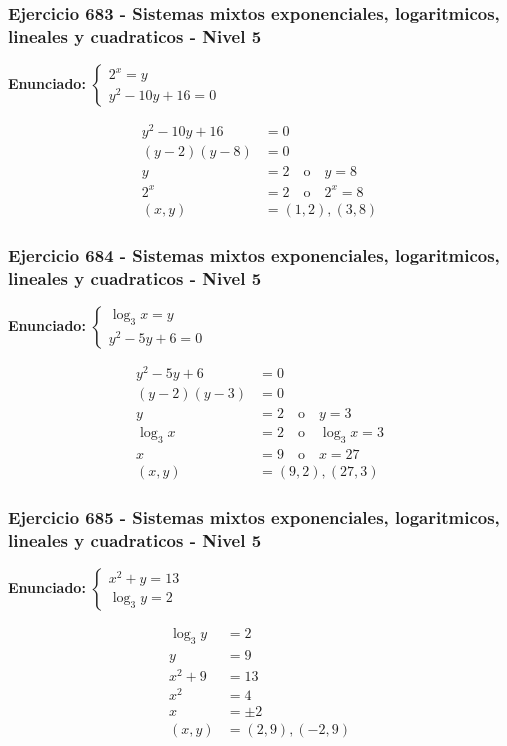 \documentclass[12pt,a4paper]{article}
\begin{document}
\subsubsection*{Ejercicio 683 - Sistemas mixtos exponenciales, logaritmicos, lineales y cuadraticos - Nivel 5}
\textbf{Enunciado:} \(\begin{cases}2^x=y\\ y^2-10y+16=0\end{cases}\)

\[
\begin{aligned}
y^2-10y+16&=0\\
(y-2)(y-8)&=0\\
y&=2\quad \text{o}\quad y=8\\
2^x&=2\quad \text{o}\quad 2^x=8\\
(x,y)&=\boxed{(1,2),(3,8)}
\end{aligned}
\]


\subsubsection*{Ejercicio 684 - Sistemas mixtos exponenciales, logaritmicos, lineales y cuadraticos - Nivel 5}
\textbf{Enunciado:} \(\begin{cases}\log_3x=y\\ y^2-5y+6=0\end{cases}\)

\[
\begin{aligned}
y^2-5y+6&=0\\
(y-2)(y-3)&=0\\
y&=2\quad \text{o}\quad y=3\\
\log_3x&=2\quad \text{o}\quad \log_3x=3\\
x&=9\quad \text{o}\quad x=27\\
(x,y)&=\boxed{(9,2),(27,3)}
\end{aligned}
\]


\subsubsection*{Ejercicio 685 - Sistemas mixtos exponenciales, logaritmicos, lineales y cuadraticos - Nivel 5}
\textbf{Enunciado:} \(\begin{cases}x^2+y=13\\ \log_3y=2\end{cases}\)

\[
\begin{aligned}
\log_3y&=2\\
y&=9\\
x^2+9&=13\\
x^2&=4\\
x&=\pm2\\
(x,y)&=\boxed{(2,9),(-2,9)}
\end{aligned}
\]
\end{document}
